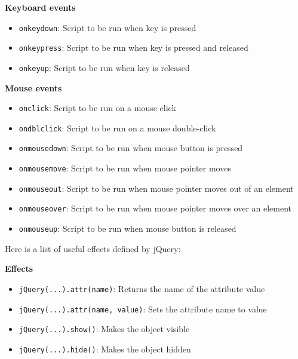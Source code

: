 \documentclass[justified,sixbynine,notoc]{tufte-book}
\def\ft{\small\tt}
\begin{document}
\begin{fullwidth}
{\bf Keyboard events}

\begin{itemize}
\item {\ft onkeydown}:  Script to be run when key is pressed

\item {\ft onkeypress}: Script to be run when key is pressed and released

\item {\ft onkeyup}:    Script to be run when key is released
\end{itemize}

{\bf Mouse events}

\begin{itemize}
\item {\ft onclick}:     Script to be run on a mouse click

\item {\ft ondblclick}:  Script to be run on a mouse double-click

\item {\ft onmousedown}: Script to be run when mouse button is pressed

\item {\ft onmousemove}: Script to be run when mouse pointer moves

\item {\ft onmouseout}:  Script to be run when mouse pointer moves out of an element

\item {\ft onmouseover}: Script to be run when mouse pointer moves over an element

\item {\ft onmouseup}:   Script to be run when mouse button is released
\end{itemize}

Here is a list of useful effects defined by jQuery:

{\bf Effects}

\begin{itemize}
\item {\ft jQuery(...).attr(name)}: Returns the name of the attribute value

\item {\ft jQuery(...).attr(name, value)}: Sets the attribute name to value

\item {\ft jQuery(...).show()}: Makes the object visible

\item {\ft jQuery(...).hide()}: Makes the object hidden


\end{itemize}
\end{fullwidth}
\end{document}
